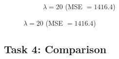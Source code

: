 \documentclass[paper=a4, fontsize=11pt]{scrartcl} %
\numberwithin{equation}{section} %
\numberwithin{figure}{section} %
\numberwithin{table}{section} %
\begin{document}
\begin{figure}[H]
	\hspace{5mm}
	\begin{subfigure}[b]{0.3\textwidth}
		\noindent{}
	\caption{$\lambda = 20$ (MSE $= 1416.4$)}
	\end{subfigure}
\end{figure}



\subsection{Task 4: Comparison}
\end{document}
